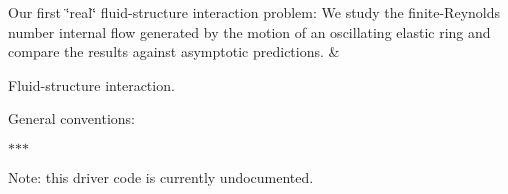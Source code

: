 \begin{longtabu}
Our first \char`\"{}real\char`\"{} fluid-\/structure interaction problem\+: We study the finite-\/\+Reynolds number internal flow generated by the motion of an oscillating elastic ring and compare the results against asymptotic predictions.  &
\begin{DoxyItemize}
\item Fluid-\/structure interaction.
\item General conventions\+:
\begin{DoxyItemize}
\item $\ast$$\ast$$\ast$
\end{DoxyItemize}
\item Note\+: this driver code is currently undocumented.  
\end{DoxyItemize}

\\
\end{longtabu}
\tabulinesep=1mm
